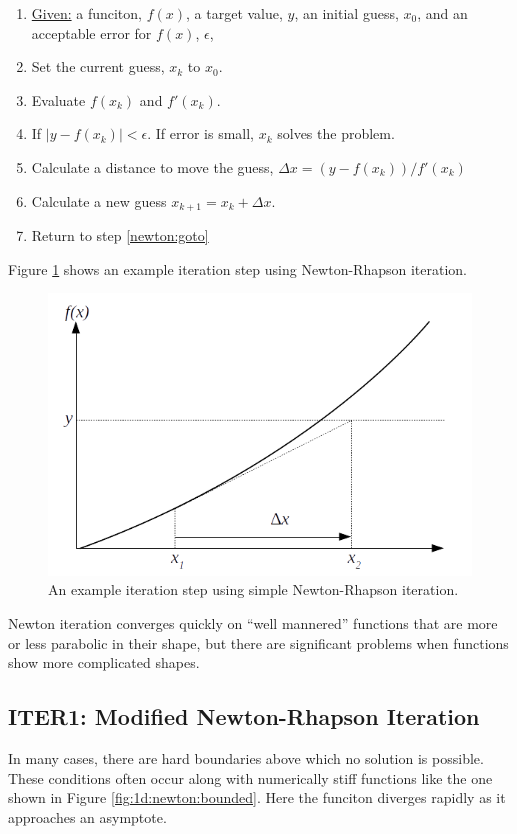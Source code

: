 \documentclass{article}
\begin{document}
\begin{enumerate}
\item \underline{Given:} a funciton, $f(x)$, a target value, $y$, an initial guess, $x_0$, and an acceptable error for $f(x)$, $\epsilon$,
\item Set the current guess, $x_k$ to $x_0$.
\item Evaluate $f(x_k)$ and $f'(x_k)$. \label{newton:goto}
\item If $|y-f(x_k)| < \epsilon$.  If error is small, $x_k$ solves the problem.
\item Calculate a distance to move the guess, $\Delta x = (y - f(x_k))/f'(x_k)$
\item Calculate a new guess $x_{k+1} = x_k + \Delta x$.
\item Return to step \ref{newton:goto}
\end{enumerate}

Figure \ref{fig:1d:newton} shows an example iteration step using Newton-Rhapson iteration.

\begin{figure}
\centering
\includegraphics[width=0.8\linewidth]{figures/1d_newton}
\caption{An example iteration step using simple Newton-Rhapson iteration.}\label{fig:1d:newton}
\end{figure}

Newton iteration converges quickly on ``well mannered'' functions that are more or less parabolic in their shape, but there are significant problems when functions show more complicated shapes.

\subsection{ITER1: Modified Newton-Rhapson Iteration}

In many cases, there are hard boundaries above which no solution is possible.  These conditions often occur along with numerically stiff functions like the one shown in Figure \ref{fig:1d:newton:bounded}.  Here the funciton diverges rapidly as it approaches an asymptote.
\end{document}
